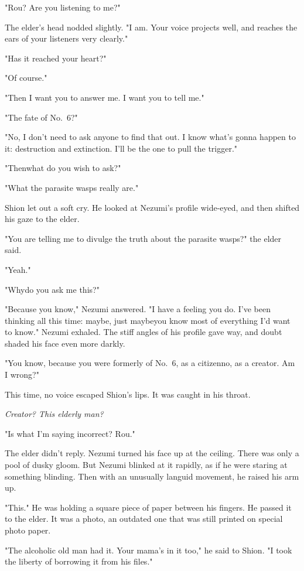 "Rou? Are you listening to me?"

The elder's head nodded slightly. "I am. Your voice projects well, and
reaches the ears of your listeners very clearly."

"Has it reached your heart?"

"Of course."

"Then I want you to answer me. I want you to tell me."

"The fate of No.~6?"

"No, I don't need to ask anyone to find that out. I know what's gonna
happen to it: destruction and extinction. I'll be the one to pull the
trigger."

"Then\el what do you wish to ask?"

"What the parasite wasps really are."

Shion let out a soft cry. He looked at Nezumi's profile wide-eyed, and
then shifted his gaze to the elder.

"You are telling me to divulge the truth about the parasite wasps?" the
elder said.

"Yeah."

"Why\el do you ask me this?"

"Because you know," Nezumi answered. "I have a feeling you do. I've been
thinking all this time: maybe, just maybe\el you know most of everything
I'd want to know." Nezumi exhaled. The stiff angles of his profile gave
way, and doubt shaded his face even more darkly.

"You know, because you were formerly of No.~6, as a citizen\el no, as a
creator. Am I wrong?"

This time, no voice escaped Shion's lips. It was caught in his throat.

\emph{Creator? This elderly man?}

"Is what I'm saying incorrect? Rou."

The elder didn't reply. Nezumi turned his face up at the ceiling. There
was only a pool of dusky gloom. But Nezumi blinked at it rapidly, as if
he were staring at something blinding. Then with an unusually languid
movement, he raised his arm up.

"This." He was holding a square piece of paper between his fingers. He
passed it to the elder. It was a photo, an outdated one that was still
printed on special photo paper.

"The alcoholic old man had it. Your mama's in it too," he said to Shion.
"I took the liberty of borrowing it from his files."

